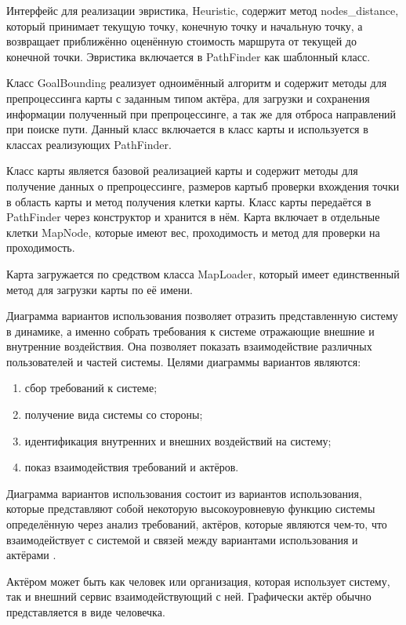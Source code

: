 
Интерфейс для реализации эвристика, Heuristic, содержит метод nodes\_distance, который принимает текущую точку, конечную точку и начальную точку, а возвращает приближённо оценённую стоимость маршрута от текущей до конечной точки. Эвристика включается в PathFinder как шаблонный класс.

Класс GoalBounding реализует одноимённый алгоритм и содержит методы для препроцессинга карты с заданным типом актёра, для загрузки и сохранения информации полученный при препроцессинге, а так же для отброса направлений при поиске пути. Данный класс включается в класс карты и используется в классах реализующих PathFinder.

Класс карты является базовой реализацией карты и содержит методы для получение данных о препроцессинге, размеров картыб проверки вхождения точки в область карты и метод получения клетки карты. Класс карты передаётся в PathFinder через конструктор и хранится в нём. Карта включает в отдельные клетки MapNode, которые имеют вес, проходимость и метод для проверки на проходимость.

Карта загружается по средством класса MapLoader, который имеет единственный метод для загрузки карты по её имени.

Диаграмма вариантов использования позволяет отразить представленную систему в динамике, а именно собрать требования к системе отражающие внешние и внутренние воздействия. Она позволяет показать взаимодействие различных пользователей и частей системы. Целями диаграммы вариантов являются:

\begin{enumerate}
	\item сбор требований к системе;
	\item получение вида системы со стороны;
	\item идентификация внутренних и внешних воздействий на систему;
	\item показ взаимодействия требований и актёров.
\end{enumerate}

Диаграмма вариантов использования состоит из вариантов использования, которые представляют собой некоторую высокоуровневую функцию системы определённую через анализ требований, актёров, которые являются чем-то, что взаимодействует с системой и связей между вариантами использования и актёрами \cite{USE_CASE}.

Актёром может быть как человек или организация, которая использует систему, так и внешний сервис взаимодействующий с ней. Графически актёр обычно представляется в виде человечка.

